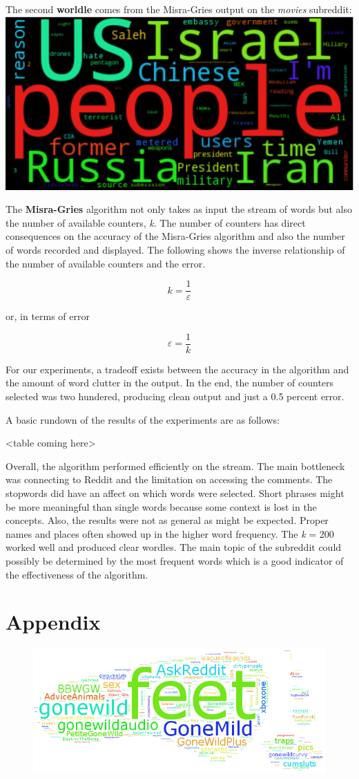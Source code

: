 \documentclass[12pt]{article}
\numberwithin{equation}{section}
\begin{document}
The second \textbf{worldle} comes from the Misra-Gries output on the \textit{movies} subreddit:
\centering
\includegraphics[scale=.5]{worldnews.png}

\raggedright

The \textbf{Misra-Gries} algorithm not only takes as input the stream of words but also the number of available counters, \textit{k}.  The number of counters has direct consequences on the accuracy of the Misra-Gries algorithm and also the number of words recorded and displayed.  The following shows the inverse relationship of the number of available counters and the error.    

\[k=\frac { 1 }{ \varepsilon  } \]  

or, in terms of error 

\[\varepsilon =\frac { 1 }{ k  } \]

For our experiments, a tradeoff exists between the accuracy in the algorithm and the amount of word clutter in the output.  In the end, the number of counters selected was two hundered, producing clean output and just a 0.5 percent error.

A basic rundown of the results of the experiments are as follows:

<table coming here>


Overall, the algorithm performed efficiently on the stream.  The main bottleneck was connecting to Reddit and the limitation on accessing the comments.  The stopwords did have an affect on which words were selected.  Short phrases might be more meaningful than single words because some context is lost in the concepts.  Also, the results were not as general as might be expected.  Proper names and places often showed up in the higher word frequency.  The \textit{k} = 200 worked well and produced clear wordles.  The main topic of the subreddit could possibly be determined by the most frequent words which is a good indicator of the effectiveness of the algorithm.   

\section*{Appendix}
\begin{figure}[h!]
	\centering
	\includegraphics[scale=.4]{feet_16.png}
\end{figure}

	
	
	
\end{document}
